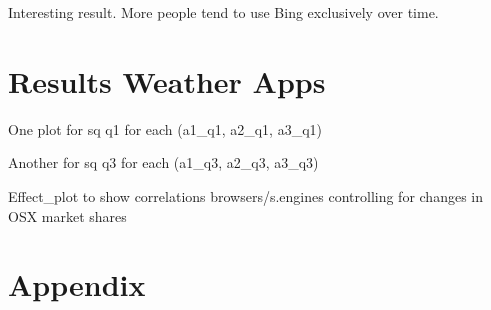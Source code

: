 \documentclass[
  11pt,
]{article}
\begin{document}
Interesting result. More people tend to use Bing exclusively over time.

\hypertarget{results-weather-apps}{%
\section{Results Weather Apps}\label{results-weather-apps}}

One plot for sq q1 for each (a1\_q1, a2\_q1, a3\_q1)

Another for sq q3 for each (a1\_q3, a2\_q3, a3\_q3)

Effect\_plot to show correlations browsers/s.engines controlling for changes in OSX market shares

\hypertarget{appendix}{%
\section{Appendix}\label{appendix}}
\end{document}
